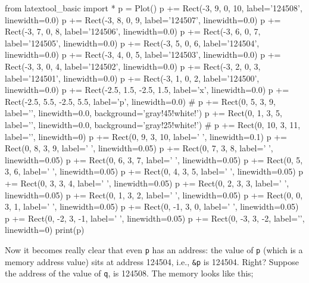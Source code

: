 \begin{python}
from latextool_basic import *
p = Plot()
p += Rect(-3, 9, 0, 10, label='124508', linewidth=0.0)
p += Rect(-3, 8, 0, 9, label='124507', linewidth=0.0)
p += Rect(-3, 7, 0, 8, label='124506', linewidth=0.0)
p += Rect(-3, 6, 0, 7, label='124505', linewidth=0.0)
p += Rect(-3, 5, 0, 6, label='124504', linewidth=0.0)
p += Rect(-3, 4, 0, 5, label='124503', linewidth=0.0)
p += Rect(-3, 3, 0, 4, label='124502', linewidth=0.0)
p += Rect(-3, 2, 0, 3, label='124501', linewidth=0.0)
p += Rect(-3, 1, 0, 2, label='124500', linewidth=0.0)
p += Rect(-2.5, 1.5, -2.5, 1.5, label='x', linewidth=0.0)
p += Rect(-2.5, 5.5, -2.5, 5.5, label='p', linewidth=0.0)
#
p += Rect(0, 5, 3, 9, label='', linewidth=0.0, background='gray!45!white!')
p += Rect(0, 1, 3, 5, label='', linewidth=0.0, background='gray!25!white!')
#
p += Rect(0, 10, 3, 11, label='', linewidth=0)
p += Rect(0, 9, 3, 10, label=' ', linewidth=0.1)
p += Rect(0, 8, 3, 9, label=' ', linewidth=0.05)
p += Rect(0, 7, 3, 8, label=' ', linewidth=0.05)
p += Rect(0, 6, 3, 7, label=' ', linewidth=0.05)
p += Rect(0, 5, 3, 6, label=' ', linewidth=0.05)
p += Rect(0, 4, 3, 5, label=' ', linewidth=0.05)
p += Rect(0, 3, 3, 4, label=' ', linewidth=0.05)
p += Rect(0, 2, 3, 3, label=' ', linewidth=0.05)
p += Rect(0, 1, 3, 2, label=' ', linewidth=0.05)
p += Rect(0, 0, 3, 1, label=' ', linewidth=0.05)
p += Rect(0, -1, 3, 0, label=' ', linewidth=0.05)
p += Rect(0, -2, 3, -1, label=' ', linewidth=0.05)
p += Rect(0, -3, 3, -2, label='', linewidth=0)
print(p)
\end{python}

Now it becomes really clear that even \texttt{p} has an address: the value of \texttt{p} (which is a memory address value) sits at address 124504, i.e., \texttt{\&p} is 124504. Right? Suppose the address of the value of \texttt{q}, is 124508. The memory looks like this;

